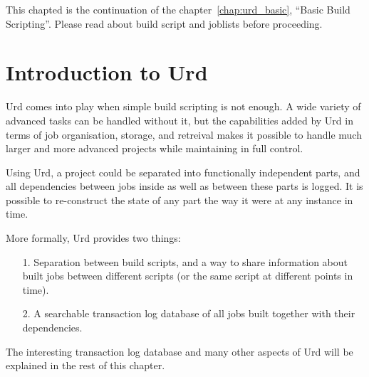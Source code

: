 
\label{chap:urd}

This chapted is the continuation of the chapter~\ref{chap:urd_basic},
``Basic Build Scripting''.  Please read about build script and
joblists before proceeding.


\section{Introduction to Urd}

Urd comes into play when simple build scripting is not enough.  A wide
variety of advanced tasks can be handled without it, but the
capabilities added by Urd in terms of job organisation, storage, and
retreival makes it possible to handle much larger and more advanced
projects while maintaining in full control.

Using Urd, a project could be separated into functionally independent
parts, and all dependencies between jobs inside as well as between
these parts is logged.  It is possible to re-construct the state of
any part the way it were at any instance in time.

More formally, Urd provides two things:
\begin{itemize}
\item[1.] Separation between build scripts,
        and a way to share information about built jobs between
        different scripts (or the same script at different points in time).
\item[2.] A searchable transaction log database of all jobs built
together with their dependencies.
\end{itemize}
The interesting transaction log database and many other aspects of Urd
will be explained in the rest of this chapter.




